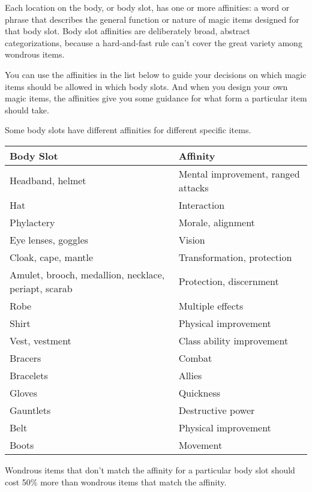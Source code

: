 \documentclass{article}
\begin{document}
Each location on the body, or body slot, has one or more affinities: a word or 
phrase that describes the general function or nature of magic items designed for 
that body slot. Body slot affinities are deliberately broad, abstract categorizations, 
because a hard-and-fast rule can't cover the great variety among wondrous items.

You can use the affinities in the list below to guide your decisions on which magic 
items should be allowed in which body slots. And when you design your own magic 
items, the affinities give you some guidance for what form a particular item should 
take.

Some body slots have different affinities for different specific items. 

\begin{tabular}{|>{\raggedright}p{110pt}|>{\raggedright}p{150pt}|}
\hline
B\textbf{ody Slot} & A\textbf{ffinity}\tabularnewline
\hline
Headband, helmet & Mental improvement, ranged attacks\tabularnewline
\hline
Hat & Interaction\tabularnewline
\hline
Phylactery & Morale, alignment\tabularnewline
\hline
Eye lenses, goggles & Vision\tabularnewline
\hline
Cloak, cape, mantle & Transformation, protection\tabularnewline
\hline
Amulet, brooch, medallion, necklace, periapt, scarab & Protection, discernment\tabularnewline
\hline
Robe  & Multiple effects\tabularnewline
\hline
Shirt  & Physical improvement\tabularnewline
\hline
Vest, vestment  & Class ability improvement\tabularnewline
\hline
Bracers  & Combat\tabularnewline
\hline
Bracelets  & Allies\tabularnewline
\hline
Gloves  & Quickness\tabularnewline
\hline
Gauntlets  & Destructive power\tabularnewline
\hline
Belt  & Physical improvement\tabularnewline
\hline
Boots  & Movement\tabularnewline
\hline
\end{tabular}

Wondrous items that don't match the affinity for a particular body slot should 
cost 50\% more than wondrous items that match the affinity.

\newpage
\end{document}
